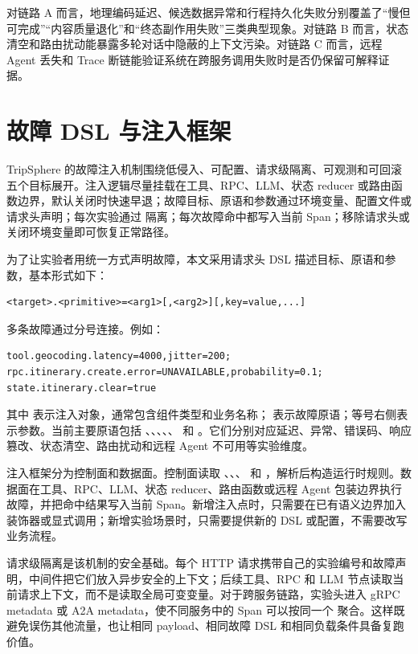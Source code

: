 对链路 A 而言，地理编码延迟、候选数据异常和行程持久化失败分别覆盖了“慢但可完成”“内容质量退化”和“终态副作用失败”三类典型现象。对链路 B 而言，状态清空和路由扰动能暴露多轮对话中隐蔽的上下文污染。对链路 C 而言，远程 Agent 丢失和 Trace 断链能验证系统在跨服务调用失败时是否仍保留可解释证据。

\section{故障 DSL 与注入框架}

TripSphere 的故障注入机制围绕低侵入、可配置、请求级隔离、可观测和可回滚五个目标展开。注入逻辑尽量挂载在工具、RPC、LLM、状态 reducer 或路由函数边界，默认关闭时快速早退；故障目标、原语和参数通过环境变量、配置文件或请求头声明；每次实验通过  隔离；每次故障命中都写入当前 Span；移除请求头或关闭环境变量即可恢复正常路径。

为了让实验者用统一方式声明故障，本文采用请求头 DSL 描述目标、原语和参数，基本形式如下：

\begin{verbatim}
<target>.<primitive>=<arg1>[,<arg2>][,key=value,...]
\end{verbatim}

多条故障通过分号连接。例如：

\begin{verbatim}
tool.geocoding.latency=4000,jitter=200;
rpc.itinerary.create.error=UNAVAILABLE,probability=0.1;
state.itinerary.clear=true
\end{verbatim}

其中  表示注入对象，通常包含组件类型和业务名称； 表示故障原语；等号右侧表示参数。当前主要原语包括 、、、、、 和 。它们分别对应延迟、异常、错误码、响应篡改、状态清空、路由扰动和远程 Agent 不可用等实验维度。

注入框架分为控制面和数据面。控制面读取 、、、 和 ，解析后构造运行时规则。数据面在工具、RPC、LLM、状态 reducer、路由函数或远程 Agent 包装边界执行故障，并把命中结果写入当前 Span。新增注入点时，只需要在已有语义边界加入装饰器或显式调用；新增实验场景时，只需要提供新的 DSL 或配置，不需要改写业务流程。

请求级隔离是该机制的安全基础。每个 HTTP 请求携带自己的实验编号和故障声明，中间件把它们放入异步安全的上下文；后续工具、RPC 和 LLM 节点读取当前请求上下文，而不是读取全局可变变量。对于跨服务链路，实验头进入 gRPC metadata 或 A2A metadata，使不同服务中的 Span 可以按同一个  聚合。这样既避免误伤其他流量，也让相同 payload、相同故障 DSL 和相同负载条件具备复跑价值。

